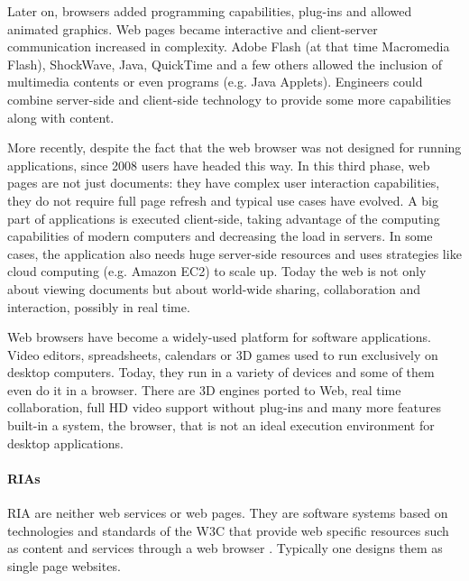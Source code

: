 Later on, browsers added programming capabilities, plug-ins and allowed animated graphics. 
Web pages became interactive and client-server communication increased in complexity.
Adobe Flash (at that time Macromedia Flash), ShockWave, Java, QuickTime and a few others allowed the inclusion of multimedia contents or even programs (e.g. Java Applets).
Engineers could combine server-side and client-side technology to provide some more capabilities along with content.

More recently, despite the fact that the web browser was not designed for running applications, since 2008 users have headed this way. 
In this third phase, web pages are not just documents: they have complex user interaction capabilities, they do not require full page refresh and typical use cases have evolved. 
A big part of applications is executed client-side, taking advantage of the computing capabilities of modern computers and decreasing the load in servers. In some cases, the application also needs huge server-side resources and uses strategies like cloud computing (e.g. Amazon EC2) to scale up.
Today the web is not only about viewing documents but about world-wide sharing, collaboration and interaction, possibly in real time. 

Web browsers have become a widely-used platform for software applications. 
Video editors, spreadsheets, calendars or 3D games used to run exclusively on desktop computers. 
Today, they run in a variety of devices and some of them even do it in a browser. 
There are 3D engines ported to Web, real time collaboration, full HD video support without plug-ins and many more features built-in a system, the browser, that is not an ideal execution environment for desktop applications.

\paragraph{\acp{RIA}}
\acs{RIA} are neither web services or web pages. 
They are software systems based on technologies and standards of the \ac{W3C} that provide web specific resources such as content and services through a web browser \cite{Kappel:2006}.
Typically one designs them as single page websites.

